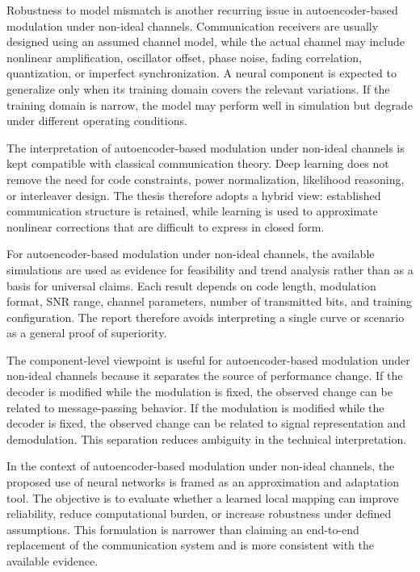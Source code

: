 Robustness to model mismatch is another recurring issue in autoencoder-based modulation under non-ideal channels. Communication receivers are usually designed using an assumed channel model, while the actual channel may include nonlinear amplification, oscillator offset, phase noise, fading correlation, quantization, or imperfect synchronization. A neural component is expected to generalize only when its training domain covers the relevant variations. If the training domain is narrow, the model may perform well in simulation but degrade under different operating conditions.

The interpretation of autoencoder-based modulation under non-ideal channels is kept compatible with classical communication theory. Deep learning does not remove the need for code constraints, power normalization, likelihood reasoning, or interleaver design. The thesis therefore adopts a hybrid view: established communication structure is retained, while learning is used to approximate nonlinear corrections that are difficult to express in closed form.

For autoencoder-based modulation under non-ideal channels, the available simulations are used as evidence for feasibility and trend analysis rather than as a basis for universal claims. Each result depends on code length, modulation format, SNR range, channel parameters, number of transmitted bits, and training configuration. The report therefore avoids interpreting a single curve or scenario as a general proof of superiority.

The component-level viewpoint is useful for autoencoder-based modulation under non-ideal channels because it separates the source of performance change. If the decoder is modified while the modulation is fixed, the observed change can be related to message-passing behavior. If the modulation is modified while the decoder is fixed, the observed change can be related to signal representation and demodulation. This separation reduces ambiguity in the technical interpretation.

In the context of autoencoder-based modulation under non-ideal channels, the proposed use of neural networks is framed as an approximation and adaptation tool. The objective is to evaluate whether a learned local mapping can improve reliability, reduce computational burden, or increase robustness under defined assumptions. This formulation is narrower than claiming an end-to-end replacement of the communication system and is more consistent with the available evidence.

